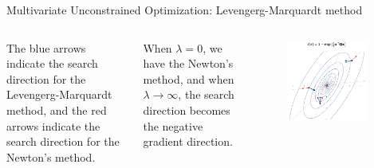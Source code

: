 \documentclass[aspectratio=169]{beamer}
\begin{document}
\begin{frame}{Multivariate Unconstrained Optimization: Levengerg-Marquardt method}
  \begin{columns}
    The blue arrows indicate the search direction for the Levengerg-Marquardt method, and the red arrows indicate the search direction for the Newton's method.
    \vspace{0.2cm}
    
    When $\lambda = 0$, we have the Newton's method, and when $\lambda \to \infty$, the search direction becomes the negative gradient direction.

    \begin{figure}
      \centering
      \includegraphics[width=0.9\textwidth]{figs/newton_vs_lm_vs_gradient_descent.pdf}
    \end{figure}
  \end{columns}
\end{frame}
\end{document}
